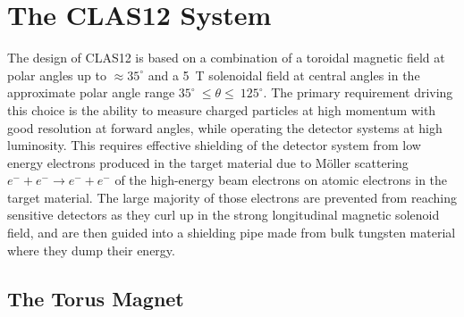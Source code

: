 \documentclass[final,3p,times,twocolumn,authoryear]{elsarticle}
\begin{document}
\section{The CLAS12 System}

The design of CLAS12 is based on a combination of a toroidal magnetic field at polar angles up to $\approx 35^\circ$ and a 5~T 
solenoidal field at central angles in the approximate polar angle range $35^\circ~\le \theta \le~125^\circ$. The primary requirement 
driving this choice is the ability to measure charged  
particles at high momentum with good resolution at forward angles, while operating the detector systems at high luminosity. 
This requires effective shielding of the detector system from low energy electrons produced in the target material due to M\"oller 
scattering $e^- + e^- \to e^- + e^-$ of the high-energy beam electrons on atomic electrons in the target material. The large majority of those 
electrons are prevented from reaching 
sensitive detectors as they curl up in the strong longitudinal magnetic solenoid field, and are then guided into a shielding pipe 
made from bulk tungsten material where they dump their energy. 

\subsection{\rm The Torus Magnet}
\label{torus}
\end{document}
